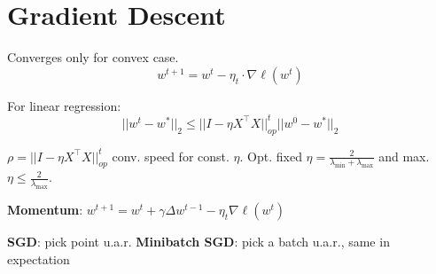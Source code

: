 \section*{Gradient Descent}
Converges only for convex case.
\[
	w^{t+1} = w^t - \eta_t \cdot \nabla \ell(w^t)
\]

For linear regression:
\[
	||w^t - w^*||_2 \leq ||I - \eta X^\top X||_{op}^t ||w^0 - w^*||_2
\]

$\rho = ||I - \eta X^\top X||_{op}^t$ conv. speed for const. $\eta$. Opt. fixed $\eta = \frac{2}{\lambda_{\text{min}} + \lambda_{\text{max}}}$ and max. $\eta \leq \frac{2}{\lambda_{\text{max}}}$. 

\textbf{Momentum}: $w^{t+1} = w^t + \gamma \Delta w^{t-1} - \eta_t \nabla \ell(w^t)$

\textbf{SGD}: pick point u.a.r.
\textbf{Minibatch SGD}: pick a batch u.a.r., same in expectation